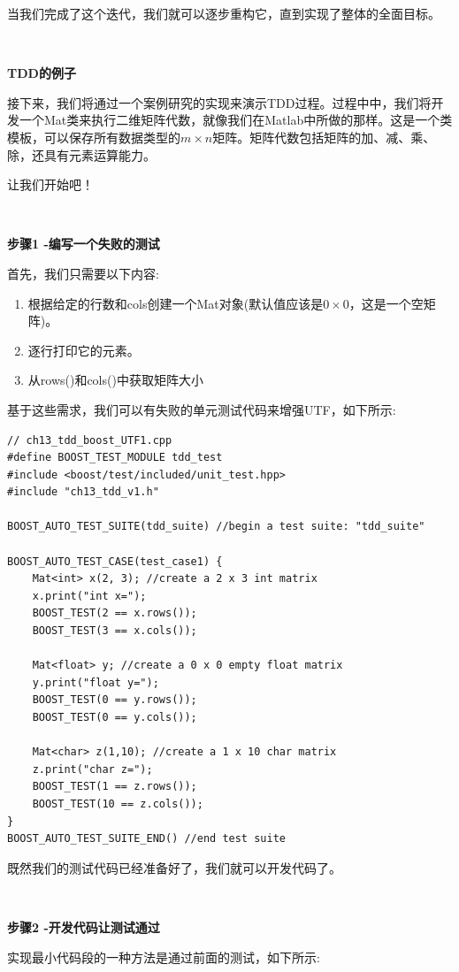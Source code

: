 当我们完成了这个迭代，我们就可以逐步重构它，直到实现了整体的全面目标。 \par

\noindent\textbf{}\ \par
\textbf{TDD的例子} \ \par
接下来，我们将通过一个案例研究的实现来演示TDD过程。过程中中，我们将开发一个Mat类来执行二维矩阵代数，就像我们在Matlab中所做的那样。这是一个类模板，可以保存所有数据类型的$ m × n $矩阵。矩阵代数包括矩阵的加、减、乘、除，还具有元素运算能力。 \par
让我们开始吧！ \par

\noindent\textbf{}\ \par
\textbf{步骤1 -编写一个失败的测试} \ \par
首先，我们只需要以下内容: \par
\begin{enumerate}
	\item 根据给定的行数和cols创建一个Mat对象(默认值应该是$ 0 × 0 $，这是一个空矩阵)。
	\item 逐行打印它的元素。
	\item 从rows()和cols()中获取矩阵大小
\end{enumerate}

基于这些需求，我们可以有失败的单元测试代码来增强UTF，如下所示: \par

\begin{lstlisting}[caption={}]
// ch13_tdd_boost_UTF1.cpp
#define BOOST_TEST_MODULE tdd_test
#include <boost/test/included/unit_test.hpp>
#include "ch13_tdd_v1.h"

BOOST_AUTO_TEST_SUITE(tdd_suite) //begin a test suite: "tdd_suite"

BOOST_AUTO_TEST_CASE(test_case1) {
	Mat<int> x(2, 3); //create a 2 x 3 int matrix
	x.print("int x=");
	BOOST_TEST(2 == x.rows());
	BOOST_TEST(3 == x.cols());
	
	Mat<float> y; //create a 0 x 0 empty float matrix
	y.print("float y=");
	BOOST_TEST(0 == y.rows());
	BOOST_TEST(0 == y.cols());
	
	Mat<char> z(1,10); //create a 1 x 10 char matrix
	z.print("char z=");
	BOOST_TEST(1 == z.rows());
	BOOST_TEST(10 == z.cols());
}
BOOST_AUTO_TEST_SUITE_END() //end test suite
\end{lstlisting}

既然我们的测试代码已经准备好了，我们就可以开发代码了。 \par

\noindent\textbf{}\ \par
\textbf{步骤2 -开发代码让测试通过} \ \par
实现最小代码段的一种方法是通过前面的测试，如下所示: \par

